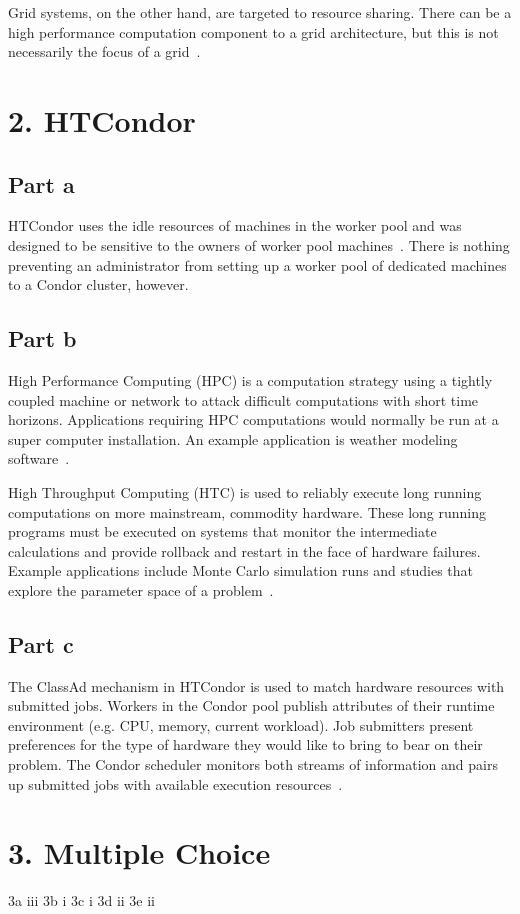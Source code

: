 \documentclass[12pt]{article}
\begin{document}
Grid systems, on the other hand, are targeted to resource
sharing. There can be a high performance computation component to a
grid architecture, but this is not necessarily the focus of a
grid~\cite{anatomy}.




\section*{2. HTCondor}
\subsection*{Part a}
HTCondor uses the idle resources of machines in the worker pool and
was designed to be sensitive to the owners of worker pool
machines~\cite{condor-man}.  There is nothing preventing an
administrator from setting up a worker pool of dedicated machines to a
Condor cluster, however.

\subsection*{Part b}
High Performance Computing (HPC) is a computation strategy using a
tightly coupled machine or network to attack difficult computations
with short time horizons. Applications requiring HPC computations
would normally be run at a super computer installation.  An example
application is weather modeling software~\cite{hpcwire}.

High Throughput Computing (HTC) is used to reliably execute long
running computations on more mainstream, commodity hardware.  These
long running programs must be executed on systems that monitor the
intermediate calculations and provide rollback and restart in the face
of hardware failures.  Example applications include Monte Carlo
simulation runs and studies that explore the parameter space of a
problem~\cite{hpcwire}.

\subsection*{Part c}
The ClassAd mechanism in HTCondor is used to match hardware resources
with submitted jobs.  Workers in the Condor pool publish attributes of
their runtime environment (e.g. CPU, memory, current workload). Job
submitters present preferences for the type of hardware they would
like to bring to bear on their problem.  The Condor scheduler monitors
both streams of information and pairs up submitted jobs with available
execution resources~\cite{condor-man}.

\section*{3. Multiple Choice}
3a iii
3b i
3c i
3d ii
3e ii



\end{document}
